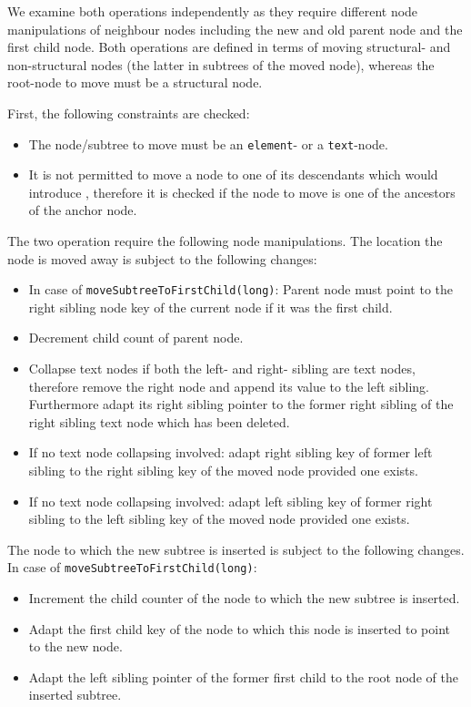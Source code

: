 We examine both operations independently as they require different node manipulations of neighbour nodes including the new and old parent node and the first child node. Both operations are defined in terms of moving structural- and non-structural nodes (the latter in subtrees of the moved node), whereas the root-node to move must be a structural node.

First, the following constraints are checked:

\begin{itemize}
\item The node/subtree to move must be an \texttt{element}- or a \texttt{text}-node.
\item It is not permitted to move a node to one of its descendants which would introduce , therefore it is checked if the node to move is one of the ancestors of the anchor node.
\end{itemize}

The two operation require the following node manipulations. The location the node is moved away is subject to the following changes:
\begin{itemize}
\item In case of \texttt{moveSubtreeToFirstChild(long)}: Parent node must point to the right sibling node key of the current node if it was the first child.
\item Decrement child count of parent node.
\item Collapse text nodes if both the left- and right- sibling are text nodes, therefore remove the right node and append its value to the left sibling. Furthermore adapt its right sibling pointer to the former right sibling of the right sibling text node which has been deleted.
\item If no text node collapsing involved: adapt right sibling key of former left sibling to the right sibling key of the moved node provided one exists.
\item If no text node collapsing involved: adapt left sibling key of former right sibling to the left sibling key of the moved node provided one exists.
\end{itemize}

The node to which the new subtree is inserted is subject to the following changes. \\
In case of \texttt{moveSubtreeToFirstChild(long)}:
\begin{itemize}
\item Increment the child counter of the node to which the new subtree is inserted.
\item Adapt the first child key of the node to which this node is inserted to point to the new node.
\item Adapt the left sibling pointer of the former first child to the root node of the inserted subtree.
\end{itemize}

